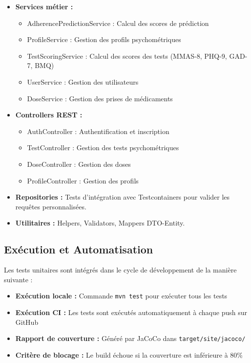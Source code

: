 \documentclass[12pt,a4paper]{report}
\begin{document}
\begin{itemize}
    \item \textbf{Services métier :} 
    \begin{itemize}
        \item AdherencePredictionService : Calcul des scores de prédiction
        \item ProfileService : Gestion des profils psychométriques
        \item TestScoringService : Calcul des scores des tests (MMAS-8, PHQ-9, GAD-7, BMQ)
        \item UserService : Gestion des utilisateurs
        \item DoseService : Gestion des prises de médicaments
    \end{itemize}
    
    \item \textbf{Controllers REST :}
    \begin{itemize}
        \item AuthController : Authentification et inscription
        \item TestController : Gestion des tests psychométriques
        \item DoseController : Gestion des doses
        \item ProfileController : Gestion des profils
    \end{itemize}
    
    \item \textbf{Repositories :} Tests d'intégration avec Testcontainers pour valider les requêtes personnalisées.
    
    \item \textbf{Utilitaires :} Helpers, Validators, Mappers DTO-Entity.
\end{itemize}

\subsection{Exécution et Automatisation}

Les tests unitaires sont intégrés dans le cycle de développement de la manière suivante :

\begin{itemize}
    \item \textbf{Exécution locale :} Commande \texttt{mvn test} pour exécuter tous les tests
    \item \textbf{Exécution CI :} Les tests sont exécutés automatiquement à chaque push sur GitHub
    \item \textbf{Rapport de couverture :} Généré par JaCoCo dans \texttt{target/site/jacoco/}
    \item \textbf{Critère de blocage :} Le build échoue si la couverture est inférieure à 80\%
\end{itemize}
\end{document}
